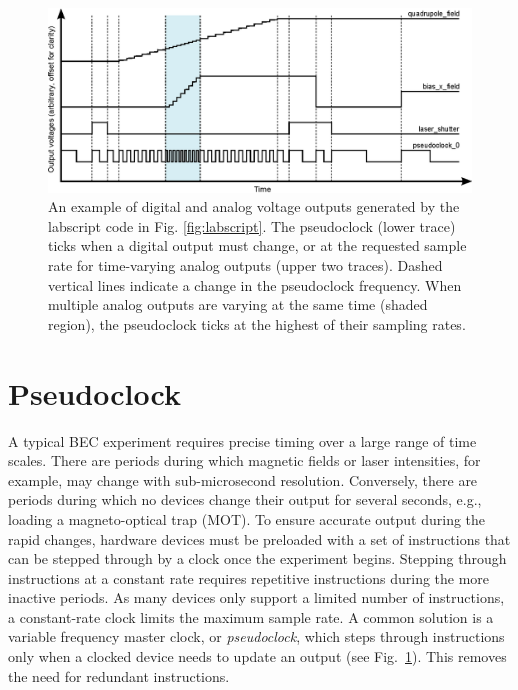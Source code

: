 \begin{figure}%
\includegraphics{figures/software/pseudoclock.eps}%
\caption{An example of digital and analog voltage outputs generated by the labscript code in Fig. \ref{fig:labscript}.
The pseudoclock (lower trace) ticks when a digital output must change, or at the requested sample rate for time-varying analog outputs (upper two traces).
Dashed vertical lines indicate a change in the pseudoclock frequency.
When multiple analog outputs are varying at the same time (shaded region), the pseudoclock ticks at the highest of their sampling rates.
}%
\label{fig:pseudoclock}%
\end{figure}

\section{Pseudoclock\label{pseudoclock}}
A typical BEC experiment requires precise timing over a large range of time scales\cite{weidemuller_cold_2009}.
There are periods during which magnetic fields or laser intensities, for example, may change with sub-microsecond resolution.
Conversely, there are periods during which no devices change their output for several seconds, e.g., loading a magneto-optical trap (MOT).
To ensure accurate output during the rapid changes, hardware devices must be preloaded with a set of instructions that can be stepped through by a clock once the experiment begins.
Stepping through instructions at a constant rate requires repetitive instructions during the more inactive periods.
As many devices only support a limited number of instructions, a constant-rate clock limits the maximum sample rate.
A common solution\cite{owen_fast_2004,beeler_matthew_disordered_2011,altin_role_2012,keshet_distributed_2013} is a variable frequency master clock, or \textit{pseudoclock}, which steps through instructions only when a clocked device needs to update an output (see Fig.~\ref{fig:pseudoclock}).
This removes the need for redundant instructions.

